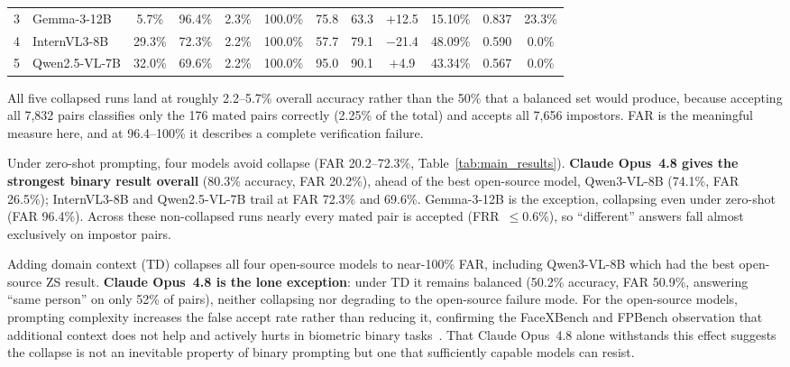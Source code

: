 \documentclass[runningheads]{llncs}
\begin{document}
\begin{table}[t]
\begin{tabular}{c l cccc cccccc}
3 & Gemma-3-12B
  & 5.7\% & \cellcolor{collapseRed}96.4\% & 2.3\% & \cellcolor{collapseRed}100.0\%
  & 75.8 & 63.3 & $+$12.5 & 15.10\%
  & \cellcolor{aucMid}0.837 & 23.3\% \\
4 & InternVL3-8B
  & 29.3\% & 72.3\% & 2.2\% & \cellcolor{collapseRed}100.0\%
  & 57.7 & 79.1 & $-$21.4 & 48.09\%
  & \cellcolor{aucWeak}0.590 & 0.0\% \\
5 & Qwen2.5-VL-7B
  & 32.0\% & 69.6\% & 2.2\% & \cellcolor{collapseRed}100.0\%
  & 95.0 & 90.1 & $+$4.9 & 43.34\%
  & \cellcolor{aucBad}0.567 & 0.0\% \\
\bottomrule
\end{tabular}
\end{table}

All five collapsed runs land at roughly 2.2--5.7\% overall accuracy rather
than the 50\% that a balanced set would produce, because accepting all
7,832 pairs classifies only the 176 mated pairs correctly (2.25\% of the
total) and accepts all 7,656 impostors.
FAR is the meaningful measure here, and at 96.4--100\% it describes a
complete verification failure.

Under zero-shot prompting, four models avoid collapse (FAR 20.2--72.3\%,
Table~\ref{tab:main_results}). \textbf{Claude Opus~4.8 gives the strongest
binary result overall} (80.3\% accuracy, FAR 20.2\%), ahead of the best
open-source model, Qwen3-VL-8B (74.1\%, FAR 26.5\%); InternVL3-8B and
Qwen2.5-VL-7B trail at FAR 72.3\% and 69.6\%. Gemma-3-12B is the exception,
collapsing even under zero-shot (FAR 96.4\%). Across these non-collapsed
runs nearly every mated pair is accepted (FRR~$\leq$0.6\%), so ``different''
answers fall almost exclusively on impostor pairs.

Adding domain context (TD) collapses all four open-source models to
near-100\% FAR, including Qwen3-VL-8B which had the best open-source ZS
result. \textbf{Claude Opus~4.8 is the lone exception}: under TD it remains
balanced (50.2\% accuracy, FAR 50.9\%, answering ``same person'' on only
52\% of pairs), neither collapsing nor degrading to the open-source
failure mode.
For the open-source models, prompting complexity increases the false
accept rate rather than reducing it, confirming the FaceXBench and FPBench
observation that additional context does not help and actively hurts in
biometric binary tasks~\cite{facexbench2024,fpbench2025}.
That Claude Opus~4.8 alone withstands this effect suggests the collapse is
not an inevitable property of binary prompting but one that sufficiently
capable models can resist.
\end{document}
